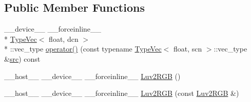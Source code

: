 \subsection*{Public Member Functions}
\begin{DoxyCompactItemize}
\item 
\-\_\-\-\_\-device\-\_\-\-\_\- \-\_\-\-\_\-forceinline\-\_\-\-\_\- \\*
\hyperlink{structcv_1_1gpu_1_1device_1_1TypeVec}{Type\-Vec}$<$ float, dcn $>$\\*
\-::vec\-\_\-type \hyperlink{structcv_1_1gpu_1_1device_1_1color__detail_1_1Luv2RGB_3_01float_00_01scn_00_01dcn_00_01srgb_00_01blueIdx_01_4_a938ed14929e469122e3584cc79473886}{operator()} (const typename \hyperlink{structcv_1_1gpu_1_1device_1_1TypeVec}{Type\-Vec}$<$ float, scn $>$\-::vec\-\_\-type \&\hyperlink{legacy_8hpp_a371cd109b74033bc4366f584edd3dacc}{src}) const 
\item 
\-\_\-\-\_\-host\-\_\-\-\_\- \-\_\-\-\_\-device\-\_\-\-\_\- \-\_\-\-\_\-forceinline\-\_\-\-\_\- \hyperlink{structcv_1_1gpu_1_1device_1_1color__detail_1_1Luv2RGB_3_01float_00_01scn_00_01dcn_00_01srgb_00_01blueIdx_01_4_afeb193d70e8d63e1ccff2de53039be95}{Luv2\-R\-G\-B} ()
\item 
\-\_\-\-\_\-host\-\_\-\-\_\- \-\_\-\-\_\-device\-\_\-\-\_\- \-\_\-\-\_\-forceinline\-\_\-\-\_\- \hyperlink{structcv_1_1gpu_1_1device_1_1color__detail_1_1Luv2RGB_3_01float_00_01scn_00_01dcn_00_01srgb_00_01blueIdx_01_4_ae00e0c174967096ac6fbd3e4a8a15c78}{Luv2\-R\-G\-B} (const \hyperlink{structcv_1_1gpu_1_1device_1_1color__detail_1_1Luv2RGB}{Luv2\-R\-G\-B} \&)
\end{DoxyCompactItemize}


